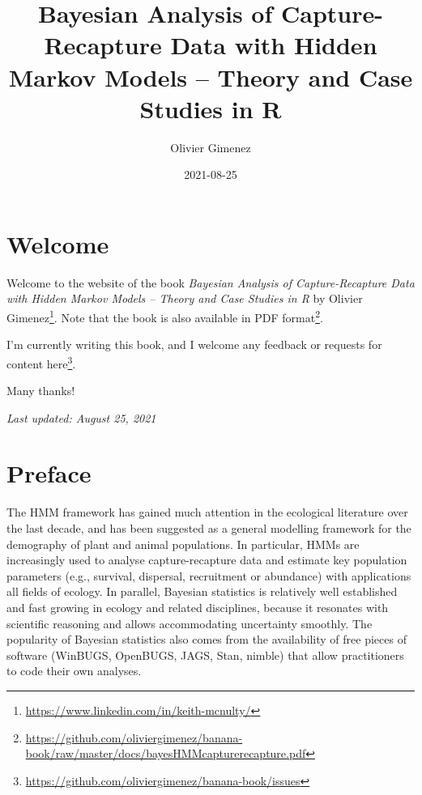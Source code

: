\documentclass[
  12pt,
]{krantz}
\title{Bayesian Analysis of Capture-Recapture Data with Hidden Markov Models -- Theory and Case Studies in R}
\author{Olivier Gimenez}
\date{2021-08-25}
\renewcommand{\href}[2]{#2\footnote{\url{#1}}}
\begin{document}
\maketitle

\thispagestyle{empty}

\setlength{\abovedisplayskip}{-5pt}
\setlength{\abovedisplayshortskip}{-5pt}

{
\hypersetup{linkcolor=}
\setcounter{tocdepth}{2}
\tableofcontents
}
\listoftables
\listoffigures
\hypertarget{welcome}{%
\chapter*{Welcome}\label{welcome}}


Welcome to the website of the book \emph{Bayesian Analysis of Capture-Recapture Data with Hidden Markov Models -- Theory and Case Studies in R} by \href{https://www.linkedin.com/in/keith-mcnulty/}{Olivier Gimenez}. Note that the book is also available in \href{https://github.com/oliviergimenez/banana-book/raw/master/docs/bayesHMMcapturerecapture.pdf}{PDF format}.

I'm currently writing this book, and I welcome any feedback or requests for content \href{https://github.com/oliviergimenez/banana-book/issues}{here}.

Many thanks!

\emph{Last updated: August 25, 2021}

\hypertarget{preface}{%
\chapter*{Preface}\label{preface}}


The HMM framework has gained much attention in the ecological literature over the last decade, and has been suggested as a general modelling framework for the demography of plant and animal populations. In particular, HMMs are increasingly used to analyse capture-recapture data and estimate key population parameters (e.g., survival, dispersal, recruitment or abundance) with applications all fields of ecology. In parallel, Bayesian statistics is relatively well established and fast growing in ecology and related disciplines, because it resonates with scientific reasoning and allows accommodating uncertainty smoothly. The popularity of Bayesian statistics also comes from the availability of free pieces of software (WinBUGS, OpenBUGS, JAGS, Stan, nimble) that allow practitioners to code their own analyses.
\end{document}
